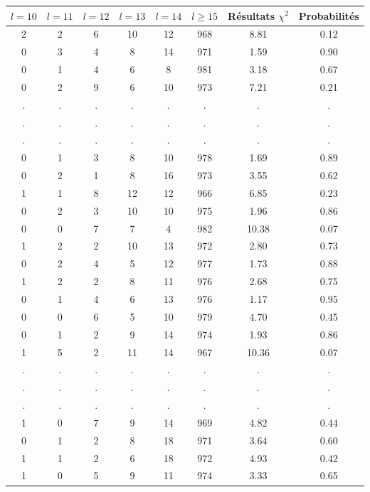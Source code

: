 \documentclass[12pt,a4paper]{article}
\begin{document}
\begin{center}
\begin{tabular}{|c|c|c|c|c|c|c|c|}
\hline
$l = 10$ & $l = 11$ & $l = 12$ & $l = 13$ & $l = 14$ & $l \geq 15$ & Résultats $\chi^2$ & Probabilités \\ \hline
2 & 2 & 6 & 10 & 12 & 968 &  8.81 &  0.12\\ \hline
0 & 3 & 4 & 8 & 14 & 971 &  1.59 &  0.90\\ \hline
0 & 1 & 4 & 6 & 8 & 981 &  3.18 &  0.67\\ \hline
0 & 2 & 9 & 6 & 10 & 973 &  7.21 &  0.21\\ \hline
 . & . & . & . & . & . & . & .\\ \hline
 . & . & . & . & . & . & . & .\\ \hline
 . & . & . & . & . & . & . & .\\ \hline
0 & 1 & 3 & 8 & 10 & 978 &  1.69 &  0.89\\ \hline
0 & 2 & 1 & 8 & 16 & 973 &  3.55 &  0.62\\ \hline
1 & 1 & 8 & 12 & 12 & 966 &  6.85 &  0.23\\ \hline
0 & 2 & 3 & 10 & 10 & 975 &  1.96 &  0.86\\ \hline
0 & 0 & 7 & 7 & 4 & 982 & 10.38 &  0.07\\ \hline
1 & 2 & 2 & 10 & 13 & 972 &  2.80 &  0.73\\ \hline
0 & 2 & 4 & 5 & 12 & 977 &  1.73 &  0.88\\ \hline
1 & 2 & 2 & 8 & 11 & 976 &  2.68 &  0.75\\ \hline
0 & 1 & 4 & 6 & 13 & 976 &  1.17 &  0.95\\ \hline
0 & 0 & 6 & 5 & 10 & 979 &  4.70 &  0.45\\ \hline
0 & 1 & 2 & 9 & 14 & 974 &  1.93 &  0.86\\ \hline
1 & 5 & 2 & 11 & 14 & 967 & 10.36 &  0.07\\ \hline
 . & . & . & . & . & . & . & .\\ \hline
 . & . & . & . & . & . & . & .\\ \hline
 . & . & . & . & . & . & . & .\\ \hline
1 & 0 & 7 & 9 & 14 & 969 &  4.82 &  0.44\\ \hline
0 & 1 & 2 & 8 & 18 & 971 &  3.64 &  0.60\\ \hline
1 & 1 & 2 & 6 & 18 & 972 &  4.93 &  0.42\\ \hline
1 & 0 & 5 & 9 & 11 & 974 &  3.33 &  0.65\\ \hline
\end{tabular}
\end{center}
\end{document}
